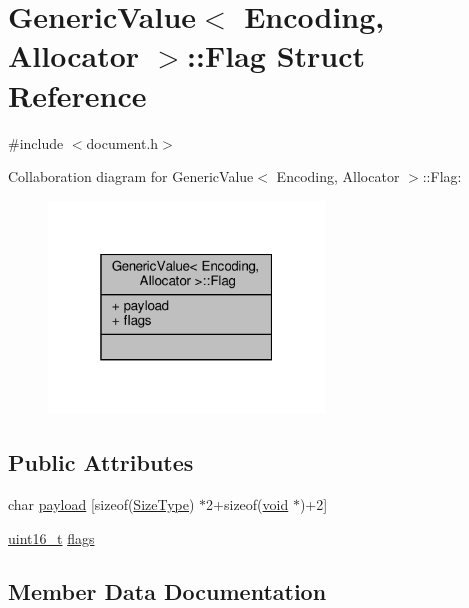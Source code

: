\hypertarget{structGenericValue_1_1Flag}{}\section{Generic\+Value$<$ Encoding, Allocator $>$\+:\+:Flag Struct Reference}
\label{structGenericValue_1_1Flag}


{\ttfamily \#include $<$document.\+h$>$}



Collaboration diagram for Generic\+Value$<$ Encoding, Allocator $>$\+:\+:Flag\+:
\nopagebreak
\begin{figure}[H]
\begin{center}
\leavevmode
\includegraphics[width=208pt]{structGenericValue_1_1Flag__coll__graph}
\end{center}
\end{figure}
\subsection*{Public Attributes}
\begin{DoxyCompactItemize}
\item 
char \hyperlink{structGenericValue_1_1Flag_aced7ede2056a797fb80817d45634e3ea}{payload} \mbox{[}sizeof(\hyperlink{rapidjson_8h_a5ed6e6e67250fadbd041127e6386dcb5}{Size\+Type}) $\ast$2+sizeof(\hyperlink{imgui__impl__opengl3__loader_8h_ac668e7cffd9e2e9cfee428b9b2f34fa7}{void} $\ast$)+2\mbox{]}
\item 
\hyperlink{stdint_8h_a273cf69d639a59973b6019625df33e30}{uint16\+\_\+t} \hyperlink{structGenericValue_1_1Flag_ac91f08067dcc0003fc78e870ca9b2d5d}{flags}
\end{DoxyCompactItemize}


\subsection{Member Data Documentation}
\mbox{\label{structGenericValue_1_1Flag_ac91f08067dcc0003fc78e870ca9b2d5d}} 
